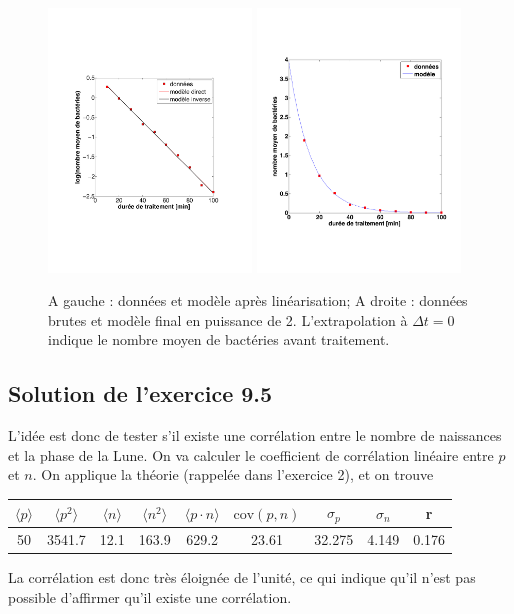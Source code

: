 \begin{figure}[t]
   \centering
   \includegraphics[height=7cm]{assets/figures/exe3fig1serie2.pdf}\hspace{7mm}
   \includegraphics[height=7cm]{assets/figures/exe3fig2serie2.pdf}
   \caption{A gauche : données et modèle après linéarisation; A droite : données brutes et modèle final en puissance de 2. L'extrapolation à $\Delta t=0$ indique le nombre moyen de bactéries avant traitement.}
   \label{fig:exe3fig1serie2}
\end{figure}

\subsection*{Solution de l'exercice 9.5}

L'idée est donc de tester s'il existe une corrélation entre le nombre de naissances et la phase de la Lune. On va calculer le coefficient de corrélation linéaire entre $p$ et $n$. On applique la théorie (rappelée dans l'exercice 2), et on trouve
\begin{center}
\begin{tabular}{ccccc|cccc}
$\langle p\rangle$ & $\langle p^2\rangle$ & $\langle n\rangle$ & $\langle n^2\rangle$ &
$\langle p\cdot n\rangle$ & $\text{cov}(p,n)$ & $\sigma_p$ & $\sigma_n$ & r\\\hline
50 & 3541.7 & 12.1 & 163.9 & 629.2 & 23.61 & 32.275 & 4.149 & 0.176
\end{tabular}
\end{center}
La corrélation est donc très éloignée de l'unité, ce qui indique qu'il n'est pas possible d'affirmer qu'il existe une corrélation.

